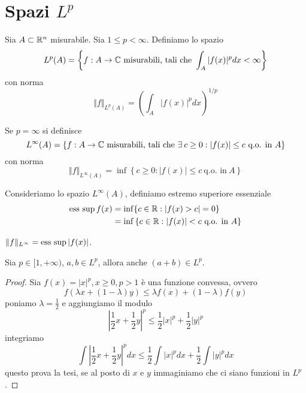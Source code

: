 \section{Spazi $L^{p}$}

\begin{defn}
[Spazio $L^{p}$] Sia $A\subset \mathbb{R}^{n}$ misurabile. Sia $1 \leq p < \infty $. Definiamo lo spazio
\begin{equation*}
L^{p}(A) = \left\{f: A\rightarrow \mathbb{C} \ \text{misurabili, tali che} \ \int_{A}| f(x)|^{p} dx < \infty \right\}
\end{equation*}
con norma
\begin{equation*}
\Vert f \Vert_{L^{p}(A)} = \left(\int_{A}| f(x)|^{p} dx\right)^{1/p}
\end{equation*}
\end{defn}
\begin{defn}
Se $p = \infty $ si definisce
\begin{equation*}
L^{\infty}(A) = \left\{f: A\rightarrow \CC \ \text{misurabili, tali che} \ \exists c \geq 0: | f(x)| \leq c\ \text{q.o. in} \ A\right\}
\end{equation*}
con norma
\begin{equation*}
\Vert f \Vert_{L^{\infty}(A)} = \inf\left\{c \geq 0: | f(x)| \leq c\ \text{q.o. in} \ A\right\}
\end{equation*}
\end{defn}
\begin{defn}
Consideriamo lo spazio $L^{\infty}(A)$, definiamo estremo superiore essenziale
\begin{equation*}
\begin{aligned}
\operatorname*{ess\ sup} f(x) & = \inf\{c\in \mathbb{R} : | f(x) > c| = 0\}\\
 & = \inf\left\{c\in \mathbb{R} : | f(x)| < c\ \text{q.o. in} \ A\right\}
\end{aligned}
\end{equation*}
\end{defn}
\begin{rem}
$ \Vert f \Vert_{L^{\infty}} = \operatorname*{ess\ sup}| f(x)| $.
\end{rem}
\begin{thm}
Sia $p\in [1, + \infty)$, $a, b\in L^{p}$, allora anche $(a + b) \in L^{p}$.
\end{thm}
\begin{proof}

Sia $f(x) = | x|^{p}, x \geq 0, p > 1$ è una funzione convessa, ovvero
\begin{equation*}
f(\lambda x + (1 - \lambda) y) \leq \lambda f(x) + (1 - \lambda) f(y)
\end{equation*}
poniamo $\lambda = \frac{1}{2}$ e aggiungiamo il modulo
\begin{equation*}
\left| \frac{1}{2} x + \frac{1}{2} y\right|^{p} \leq \frac{1}{2}| x|^{p} + \frac{1}{2}| y|^{p}
\end{equation*}
integriamo
\begin{equation*}
\int \left| \frac{1}{2} x + \frac{1}{2} y\right|^{p} dx \leq \frac{1}{2}\int | x|^{p} dx + \frac{1}{2}\int | y|^{p} dx
\end{equation*}
questo prova la tesi, se al posto di $x$ e $y$ immaginiamo che ci siano funzioni in $L^{p}$.
\end{proof}
